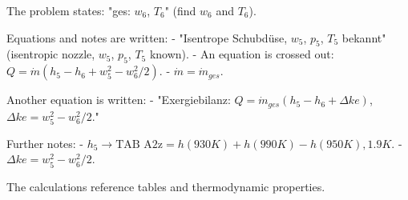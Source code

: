 The problem states: "ges: \( w_6 \), \( T_6 \)" (find \( w_6 \) and \( T_6 \)).  

Equations and notes are written:  
- "Isentrope Schubdüse, \( w_5 \), \( p_5 \), \( T_5 \) bekannt" (isentropic nozzle, \( w_5 \), \( p_5 \), \( T_5 \) known).  
- An equation is crossed out: \( Q = \dot{m} (h_5 - h_6 + w_5^2 - w_6^2 / 2) \).  
- \( \dot{m} = \dot{m}_{ges} \).  

Another equation is written:  
- "Exergiebilanz: \( Q = \dot{m}_{ges} (h_5 - h_6 + \Delta ke) \), \( \Delta ke = w_5^2 - w_6^2 / 2 \)."  

Further notes:  
- \( h_5 \to \text{TAB A2z} = h(930K) + h(990K) - h(950K), 1.9K \).  
- \( \Delta ke = w_5^2 - w_6^2 / 2 \).  

The calculations reference tables and thermodynamic properties.